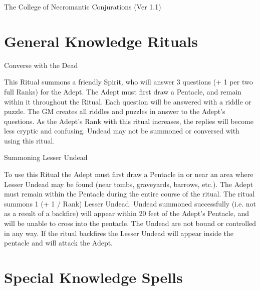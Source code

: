 \begin{Chapter}{The College of Necromantic Conjurations (Ver 1.1)}
\section{General Knowledge Rituals}

\begin{ritual}[Q-1]{Converse with the Dead}

\begin{effects}
This Ritual summons a friendly Spirit, who will answer 3 questions (+
1 per two full Ranks) for the Adept. The Adept must first draw a
Pentacle, and remain within it throughout the Ritual.  Each question
will be answered with a riddle or puzzle.  The GM creates all riddles
and puzzles in answer to the Adept’s questions.  As the Adept’s Rank
with this ritual increases, the replies will become less cryptic and
confusing.  Undead may not be summoned or conversed with using this
ritual.
\end{effects}
\end{ritual}

\begin{ritual}[Q-2]{Summoning Lesser Undead}

\begin{effects}
To use this Ritual the Adept must first draw a Pentacle in or near an
area where Lesser Undead may be found (near tombs, graveyards,
barrows, etc.).  The Adept must remain within the Pentacle during the
entire course of the ritual. The ritual summons 1 (+ 1 / Rank) Lesser
Undead.  Undead summoned successfully (i.e. not as a result of a
backfire) will appear within 20 feet of the Adept’s Pentacle, and will
be unable to cross into the pentacle.  The Undead are not bound or
controlled in any way. If the ritual backfires the Lesser Undead will
appear inside the pentacle and will attack the Adept.
\end{effects}
\end{ritual}

\section{Special Knowledge Spells}


\end{Chapter}
